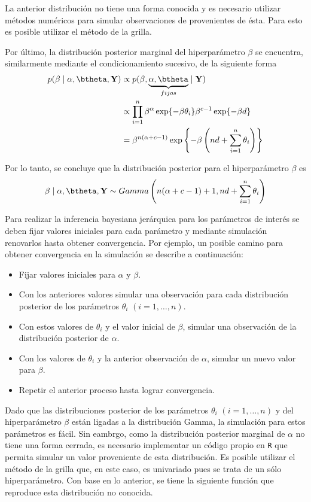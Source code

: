 \documentclass[10pt,openright]{book}\usepackage[]{graphicx}\usepackage[]{color}
\begin{document}
La anterior distribuci\'on no tiene una forma conocida y es necesario utilizar m\'etodos num\'ericos para simular observaciones de provenientes de \'esta. Para esto es posible utilizar el m\'etodo de la grilla.

Por \'ultimo, la distribuci\'on posterior marginal del hiperpar\'ametro $\beta$ se encuentra, similarmente mediante el condicionamiento sucesivo, de la siguiente forma
\begin{align*}
p(\beta \mid \alpha,\btheta,\mathbf{Y})
&\propto p(\beta, \underbrace{\alpha,\btheta}_{fijos}\mid\mathbf{Y})\\
&\propto \prod_{i=1}^n \beta^{\alpha}\exp\{-\beta\theta_i\}\beta^{c-1}\exp\{-\beta d\}\\
&=\beta^{n(\alpha+c-1)}\exp\left\{-\beta\left(nd+\sum_{i=1}^n\theta_i\right)\right\}
\end{align*}

Por lo tanto, se concluye que la distribuci\'on posterior para el hiperpar\'ametro $\beta$ es
\begin{equation*}
\beta\mid \alpha,\btheta,\mathbf{Y}
\sim Gamma\left(n(\alpha+c-1)+1, nd+\sum_{i=1}^n\theta_i\right)
\end{equation*}

Para realizar la inferencia bayesiana jer\'arquica para los par\'ametros de inter\'es se deben fijar valores iniciales para cada par\'ametro y mediante simulaci\'on renovarlos hasta obtener convergencia. Por ejemplo, un posible camino para obtener convergencia en la simulaci\'on se describe a continuaci\'on:

\begin{itemize}
  \item Fijar valores iniciales para $\alpha$ y $\beta$.
  \item Con los anteriores valores simular una observaci\'on para cada distribuci\'on posterior de los par\'ametros $\theta_i$ $(i=1,\ldots,n)$.
  \item Con estos valores de $\theta_i$ y el valor inicial de $\beta$, simular una observaci\'on de la distribuci\'on posterior de $\alpha$.
  \item Con los valores de $\theta_i$ y la anterior observaci\'on de $\alpha$, simular un nuevo valor para $\beta$.
  \item Repetir el anterior proceso hasta lograr convergencia.
\end{itemize}

Dado que las distribuciones posterior de los par\'ametros $\theta_i$ $(i=1,\ldots,n)$ y del hiperpar\'ametro $\beta$ est\'an ligadas a la distribuci\'on Gamma, la simulaci\'on para estos par\'ametros es f\'acil. Sin eambrgo, como la distribuci\'on posterior marginal de $\alpha$ no tiene una forma cerrada, es necesario implementar un c\'odigo propio en \verb'R' que permita simular un valor proveniente de esta distribuci\'on. Es posible utilizar el m\'etodo de la grilla que, en este caso, es univariado pues se trata de un s\'olo hiperpar\'ametro. Con base en lo anterior, se tiene la siguiente funci\'on que reproduce esta distribuci\'on no conocida.
\end{document}
